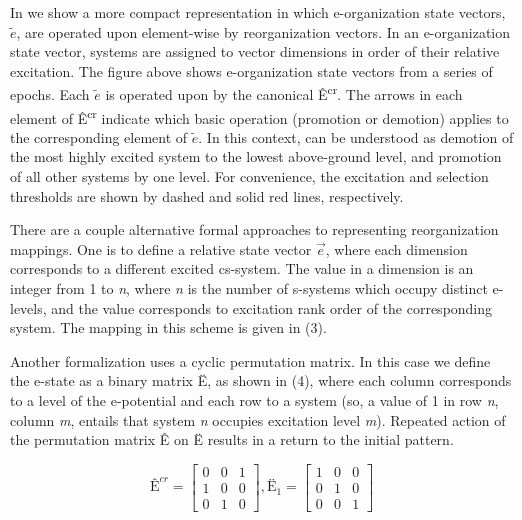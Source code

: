   In {} we show a more compact representation in which e-organization state vectors,  $\widetilde{{e}}$, are operated upon element-wise by reorganization vectors. In an e-organization state vector, systems are assigned to vector dimensions in order of their relative excitation. The figure above shows e-organization state vectors from a series of epochs. Each  $\widetilde{{e}}$ is operated upon by the canonical  Ê\textsuperscript{cr}. The arrows in each element of Ê\textsuperscript{cr} indicate which basic operation (promotion or demotion) applies to the corresponding element of  $\widetilde{{e}}$. In this context,  can be understood as demotion of the most highly excited system to the lowest above-ground level, and promotion of all other systems by one level. For convenience, the excitation and selection thresholds are shown by dashed and solid red lines, respectively.

  There are a couple alternative formal approaches to representing reorganization mappings. One is to define a relative  state vector  $\overrightarrow{{e}}$, where each dimension corresponds to a different excited cs-system. The value in a dimension is an integer from 1 to \textit{n}, where \textit{n} is the number of s-systems which occupy distinct e-levels, and the value corresponds to excitation rank order of the corresponding system. The  mapping in this scheme is given in (3).


  Another formalization uses a cyclic permutation matrix. In this case we define the e-state as a binary matrix Ë, as shown in (4), where each column corresponds to a level of the e-potential and each row to a system (so, a value of 1 in row \textit{n}, column \textit{m}, entails that system \textit{n} occupies excitation level \textit{m}). Repeated action of the permutation matrix Ê on Ë results in a return to the initial pattern. 

\ea
$$
\text{Ê}^{{cr}}=
\left[
  \begin{matrix}
  0 & 0 & 1\\
  1 & 0 & 0\\
  0 & 1 & 0
  \end{matrix}
\right],
{\text{Ë}}_{1}=
\left[
  \begin{matrix}
  1 & 0 & 0\\
  0 & 1 & 0\\
  0 & 0 & 1
  \end{matrix}
\right]
$$
\z


